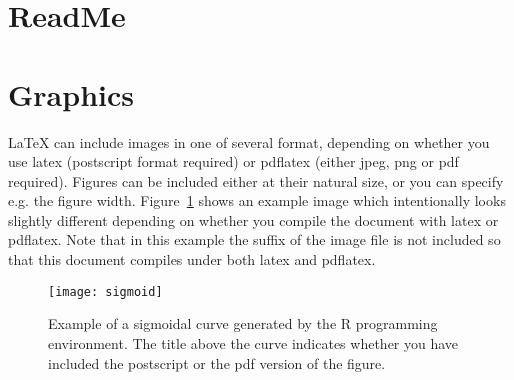 \documentclass{article}
\providecommand*{\latex}{\LaTeX\xspace}
\begin{document}
\section{ReadMe}

\section{Graphics}
\label{sec:graphics}

\latex can include images in one of several format, depending on
whether you use latex (postscript format required) or pdflatex (either
jpeg, png or pdf required).  Figures can be included either at their
natural size, or you can specify e.g. the figure width.
Figure~\ref{fig:example} shows an example image which intentionally
looks slightly different depending on whether you compile the document
with latex or pdflatex.  Note that in this example the suffix of the
image file is not included so that this document compiles under both
latex and pdflatex.

\begin{figure}[!htb]
  \centering
  \texttt{[image: sigmoid]}
  \caption{Example of a sigmoidal curve generated by the R programming
    environment.  The title above the curve indicates whether you have
  included the postscript or the pdf version of the figure.}
  \label{fig:example}
\end{figure}





\end{document}
